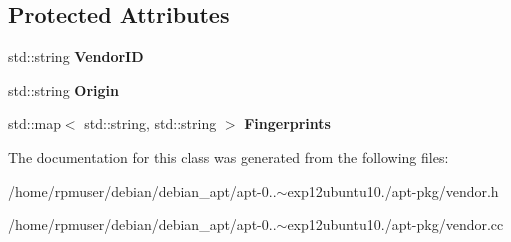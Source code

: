 \subsection*{\-Protected \-Attributes}
\begin{DoxyCompactItemize}
\item 
std\-::string {\bfseries \-Vendor\-I\-D}\label{classVendor_a96a898eabc1d57a772d7360f9d98fe5f}

\item 
std\-::string {\bfseries \-Origin}\label{classVendor_aa1c00e00ed8f483876e1b1b2ba904227}

\item 
std\-::map$<$ std\-::string, \*
std\-::string $>$ {\bfseries \-Fingerprints}\label{classVendor_a0a9b3216d9ebae259f316ea1c0323a40}

\end{DoxyCompactItemize}


\-The documentation for this class was generated from the following files\-:\begin{DoxyCompactItemize}
\item 
/home/rpmuser/debian/debian\-\_\-apt/apt-\/0..$\sim$exp12ubuntu10./apt-\/pkg/vendor.\-h\item 
/home/rpmuser/debian/debian\-\_\-apt/apt-\/0..$\sim$exp12ubuntu10./apt-\/pkg/vendor.\-cc\end{DoxyCompactItemize}
